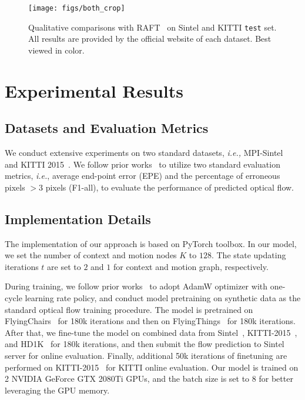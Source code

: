 \documentclass[letterpaper]{article} %
\begin{document}
\begin{figure}[ht]
	\begin{center}
		\texttt{[image: figs/both\_crop]}
	\end{center}
	\caption{Qualitative comparisons with RAFT~\cite{Teed2020RAFTRA} on Sintel and KITTI {\tt test} set. All results are provided by the official website of each dataset. Best viewed in color.}
	\label{fig:both}
\end{figure}


\section{Experimental Results}

\subsection{Datasets and Evaluation Metrics}

We conduct extensive experiments on two standard datasets, {\em i.e.,} MPI-Sintel~\cite{Butler2012} and KITTI 2015~\cite{KITTI_2015}. We follow prior works~\cite{Teed2020RAFTRA, Jiang2021LearningOF} to utilize two standard evaluation metrics, {\em i.e.}, average end-point error (EPE) and the percentage of erroneous pixels $> 3$ pixels (F1-all), to evaluate the performance of predicted optical flow.

\subsection{Implementation Details}

The implementation of our approach is based on PyTorch toolbox. In our model, we set the number of context and motion nodes $K$ to $128$. The state updating iterations $t$ are set to $2$ and $1$ for context and motion graph, respectively.

During training, we follow prior works~\cite{Teed2020RAFTRA, Jiang2021LearningTE} to adopt AdamW optimizer with one-cycle learning rate policy, and conduct model pretraining on synthetic data as the standard optical flow training procedure. The model is pretrained on FlyingChairs~\cite{Dosovitskiy2015FlowNetLO} for 180k iterations and then on FlyingThings~\cite{Mayer2016ALD} for 180k iterations. After that, we fine-tune the model on combined data from Sintel~\cite{Butler2012}, KITTI-2015~\cite{KITTI_2015}, and HD1K~\cite{Kondermann2016TheHB} for 180k iterations, and then submit the flow prediction to Sintel server for online evaluation. Finally, additional 50k iterations of finetuning are performed on KITTI-2015~\cite{KITTI_2015} for KITTI online evaluation. Our model is trained on 2 NVIDIA GeForce GTX 2080Ti GPUs, and the batch size is set to $8$ for better leveraging the GPU memory.
\end{document}
